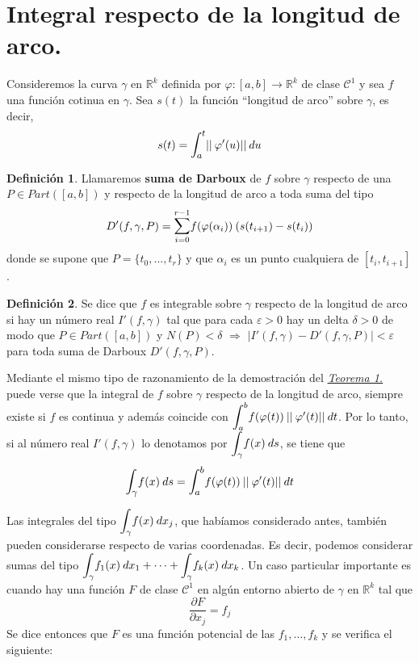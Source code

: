 \documentclass[12pt,twoside]{report}
\newcommand\mc[1]{\mathcal{#1}}
\theoremstyle{azul}
\theoremstyle{azul2}
\theoremstyle{plain}
\theoremstyle{definition}
\newtheorem{defin}{Definición}[chapter]
\theoremstyle{remark}
\begin{document}
\section{Integral respecto de la longitud de arco.}
Consideremos la curva $\gamma$ en $\mathbb{R}^k$ definida por $\varphi: [a,b] \longrightarrow \mathbb{R}^k$ de clase $\mc{C}^1$ y sea $f$ una función cotinua en $\gamma$. Sea $s(t)$ la función ``longitud de arco'' sobre $\gamma$, es decir, 
$$s(t)=\mathlarger{\int_a^t} ||\: \varphi'(u)|| \: du$$

\begin{defin}
Llamaremos \textbf{suma de Darboux} de $f$ sobre $\gamma$ respecto de una $P \in Part([a,b])$ y respecto de la longitud de arco a toda suma del tipo 
$$D'(f,\gamma,P) = \mathlarger{\sum}_{i=0}^{r-1} f(\varphi(\alpha_i)) \: (s(t_{i+1}) - s(t_i))$$
donde se supone que $P=\{t_0, \ldots, t_r\}$ y que $\alpha_i$ es un punto cualquiera de $[t_i, t_{i+1}]$.
\end{defin}
\begin{defin}
Se dice que $f$ es integrable sobre $\gamma$ respecto de la longitud de arco si hay un número real $I'(f,\gamma)$ tal que para cada $\varepsilon > 0$ hay un delta $\delta > 0$ de modo que $P \in Part([a,b])$ y $N(P) < \delta$ $\Rightarrow$ $|I'(f, \gamma) - D'(f,\gamma,P)| < \varepsilon$ para toda suma de Darboux $D'(f,\gamma,P)$. 

Mediante el mismo tipo de razonamiento de la demostración del \hyperref[teo11]{\textit{Teorema 1.}} puede verse que la integral de $f$ sobre $\gamma$ respecto de la longitud de arco, siempre existe si $f$ es continua y además coincide con $\mathlarger{\int_a^b} f(\varphi(t)) \: ||\: \varphi ' (t)|| \: dt$. Por lo tanto, si al número real $I'(f,\gamma)$ lo denotamos por $\mathlarger{\int_{\gamma}} f(x) \: ds$, se tiene que 
$$\mathlarger{\int_{\gamma}} f(x) \: ds = \mathlarger{\int_a^b} f(\varphi(t)) \: ||\: \varphi ' (t)|| \: dt$$
\end{defin}

Las integrales del tipo $\mathlarger{\int_{\gamma}} f(x) \: dx_j $, que habíamos considerado antes, también pueden considerarse respecto de varias coordenadas. Es decir, podemos considerar sumas del tipo $\mathlarger{\int_{\gamma}} f_1(x) \: dx_1 + \cdots + \mathlarger{\int_{\gamma}} f_k(x) \: dx_k$. Un caso particular importante es cuando hay una función $F$ de clase $\mc{C}^1$ en algún entorno abierto de $\gamma$ en $\mathbb{R}^k$ tal que 
$$\dfrac{\partial F}{\partial x_j} = f_j$$
Se dice entonces que $F$ es una función potencial de las $f_1, \ldots, f_k$ y se verifica el siguiente: 
\end{document}
